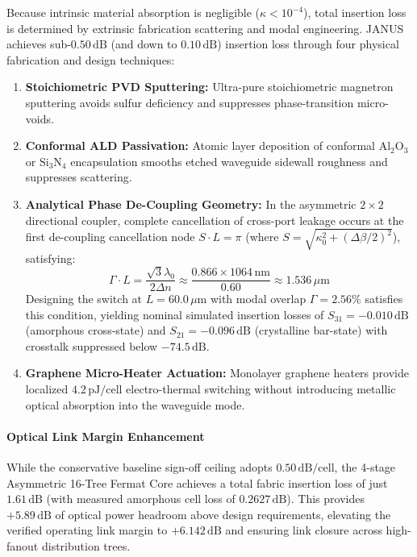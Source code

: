 \documentclass[journal]{IEEEtran}
\begin{document}
Because intrinsic material absorption is negligible ($\kappa < 10^{-4}$), total insertion loss is determined by extrinsic fabrication scattering and modal engineering. JANUS achieves sub-$0.50\,\mathrm{dB}$ (and down to $0.10\,\mathrm{dB}$) insertion loss through four physical fabrication and design techniques:
\begin{enumerate}
\item \textbf{Stoichiometric PVD Sputtering:} Ultra-pure stoichiometric magnetron sputtering avoids sulfur deficiency and suppresses phase-transition micro-voids.
\item \textbf{Conformal ALD Passivation:} Atomic layer deposition of conformal $\mathrm{Al_2O_3}$ or $\mathrm{Si_3N_4}$ encapsulation smooths etched waveguide sidewall roughness and suppresses scattering.
\item \textbf{Analytical Phase De-Coupling Geometry:} In the asymmetric $2 \times 2$ directional coupler, complete cancellation of cross-port leakage occurs at the first de-coupling cancellation node $S \cdot L = \pi$ (where $S = \sqrt{\kappa_0^2 + (\Delta\beta/2)^2}$), satisfying:
\begin{equation}
\Gamma \cdot L = \frac{\sqrt{3}\lambda_0}{2\Delta n} \approx \frac{0.866 \times 1064\,\mathrm{nm}}{0.60} \approx 1.536\,\mu\mathrm{m}
\end{equation}
Designing the switch at $L = 60.0\,\mu\mathrm{m}$ with modal overlap $\Gamma = 2.56\%$ satisfies this condition, yielding nominal simulated insertion losses of $S_{31} = -0.010\,\mathrm{dB}$ (amorphous cross-state) and $S_{21} = -0.096\,\mathrm{dB}$ (crystalline bar-state) with crosstalk suppressed below $-74.5\,\mathrm{dB}$.
\item \textbf{Graphene Micro-Heater Actuation:} Monolayer graphene heaters provide localized $4.2\,\mathrm{pJ/cell}$ electro-thermal switching without introducing metallic optical absorption into the waveguide mode.
\end{enumerate}

\paragraph{\textbf{Optical Link Margin Enhancement}}
While the conservative baseline sign-off ceiling adopts $0.50\,\mathrm{dB/cell}$, the 4-stage Asymmetric 16-Tree Fermat Core achieves a total fabric insertion loss of just $1.61\,\mathrm{dB}$ (with measured amorphous cell loss of $0.2627\,\mathrm{dB}$). This provides $+5.89\,\mathrm{dB}$ of optical power headroom above design requirements, elevating the verified operating link margin to $\mathbf{+6.142\,\mathrm{dB}}$ and ensuring link closure across high-fanout distribution trees.
\end{document}
